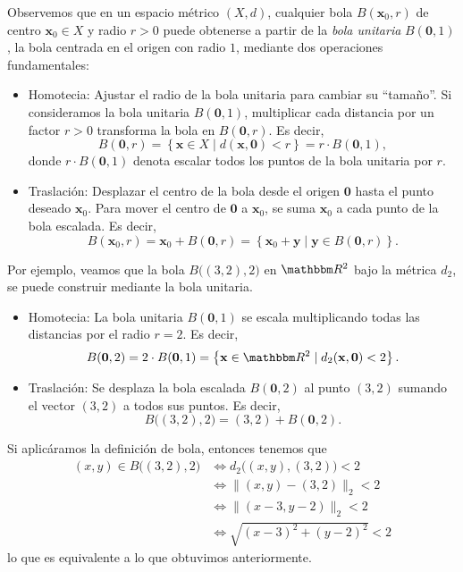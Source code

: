 Observemos que en un espacio métrico $(X, d)$, cualquier bola $B(\mathbf{x}_0, r)$ de centro $\mathbf{x}_0 \in X$ y radio $r > 0$ puede obtenerse a partir de la \emph{bola unitaria} $B(\mathbf{0}, 1)$, la bola centrada en el origen con radio $1$, mediante dos operaciones fundamentales:
\begin{itemize}
    \item Homotecia: Ajustar el radio de la bola unitaria para cambiar su “tamaño”. Si consideramos la bola unitaria $B(\mathbf{0}, 1)$, multiplicar cada distancia por un factor $r > 0$ transforma la bola en $B(\mathbf{0}, r)$. Es decir,
    $$B(\mathbf{0}, r) = \left\{ \mathbf{x} \in X \mid d(\mathbf{x}, \mathbf{0}) < r \right\} = r \cdot B(\mathbf{0}, 1),$$
    donde $r \cdot B(\mathbf{0}, 1)$ denota escalar todos los puntos de la bola unitaria por $r$.  
    \item Traslación: Desplazar el centro de la bola desde el origen $\mathbf{0}$ hasta el punto deseado $\mathbf{x}_0$. Para mover el centro de $\mathbf{0}$ a $\mathbf{x}_0$, se suma $\mathbf{x}_0$ a cada punto de la bola escalada. Es decir,
    $$B(\mathbf{x}_0, r) = \mathbf{x}_0 + B(\mathbf{0}, r) = \left\{ \mathbf{x}_0 + \mathbf{y} \mid \mathbf{y} \in B(\mathbf{0}, r) \right\}.$$
\end{itemize}

Por ejemplo, veamos que la bola $B\big((3, 2), 2\big)$ en $\RR[2]$ bajo la métrica $d_2$, se puede construir mediante la bola unitaria.
\begin{itemize}
    \item Homotecia: La bola unitaria $B(\mathbf{0}, 1)$ se escala multiplicando todas las distancias por el radio $r = 2$. Es decir,
    $$B(\mathbf{0}, 2) = 2 \cdot B(\mathbf{0}, 1) = \left\{ \mathbf{x} \in \RR[2] \mid d_2(\mathbf{x}, \mathbf{0}) < 2 \right\}.$$
    \item Traslación: Se desplaza la bola escalada $B(\mathbf{0}, 2)$ al punto $(3, 2)$ sumando el vector $(3, 2)$ a todos sus puntos. Es decir,
    $$B\big((3, 2), 2\big) = (3, 2) + B(\mathbf{0}, 2).$$
\end{itemize}
Si aplicáramos la definición de bola, entonces tenemos que
\begin{align*}
    (x, y) \in B\big((3, 2), 2\big) & \Longleftrightarrow d_2 \big( (x, y), (3, 2) \big) < 2 \\
    & \Longleftrightarrow \| (x, y) - (3, 2) \|_2 < 2 \\
    & \Longleftrightarrow \| (x - 3, y - 2) \|_2 < 2 \\
    & \Longleftrightarrow \sqrt{(x - 3)^2 + (y - 2)^2} < 2
\end{align*}
lo que es equivalente a lo que obtuvimos anteriormente.

